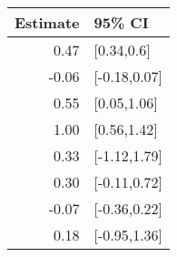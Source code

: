 \begin{tabular}{rl}
  \hline
Estimate & 95\% CI \\ 
  \hline
0.47 & [0.34,0.6] \\ 
  -0.06 & [-0.18,0.07] \\ 
  0.55 & [0.05,1.06] \\ 
  1.00 & [0.56,1.42] \\ 
  0.33 & [-1.12,1.79] \\ 
  0.30 & [-0.11,0.72] \\ 
  -0.07 & [-0.36,0.22] \\ 
  0.18 & [-0.95,1.36] \\ 
   \hline
\end{tabular}

